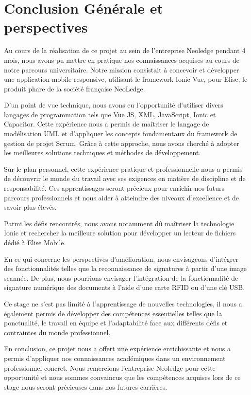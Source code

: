 \chapter*{Conclusion Générale et perspectives}
\label{sec:conclusion}
\setlength{\parindent}{1em}
  

Au cours de la réalisation de ce projet au sein de l'entreprise Neoledge pendant 4 mois, nous avons pu mettre en pratique nos connaissances acquises au cours de notre parcours universitaire. Notre mission consistait à concevoir et développer une application mobile responsive, utilisant le framework Ionic Vue, pour Elise, le produit phare de la société française NeoLedge. 

\medskip

D'un point de vue technique, nous avons eu l'opportunité d'utiliser divers langages de programmation tels que Vue JS, XML, JavaScript, Ionic et Capacitor. Cette expérience nous a permis de maîtriser le langage de modélisation UML et d'appliquer les concepts fondamentaux du framework de gestion de projet Scrum. Grâce à cette approche, nous avons cherché à adopter les meilleures solutions techniques et méthodes de développement. 

\medskip

Sur le plan personnel, cette expérience pratique et professionnelle nous a permis de découvrir le monde du travail avec ses exigences en matière de discipline et de responsabilité. Ces apprentissages seront précieux pour enrichir nos futurs parcours professionnels et nous aider à atteindre des niveaux d'excellence et de savoir plus élevés. 

\medskip

Parmi les défis rencontrés, nous avons notamment dû maîtriser la technologie Ionic et rechercher la meilleure solution pour développer un lecteur de fichiers dédié à Elise Mobile. 

\medskip

En ce qui concerne les perspectives d'amélioration, nous envisageons d'intégrer des fonctionnalités telles que la reconnaissance de signatures à partir d'une image scannée. De plus, nous pourrions envisager l'intégration de la fonctionnalité de signature numérique des documents à l'aide d'une carte RFID ou d'une clé USB. 

\medskip

Ce stage ne s'est pas limité à l'apprentissage de nouvelles technologies, il nous a également permis de développer des compétences essentielles telles que la ponctualité, le travail en équipe et l'adaptabilité face aux différents défis et contraintes du monde professionnel. 

\medskip

En conclusion, ce projet nous a offert une expérience enrichissante et nous a permis d'appliquer nos connaissances académiques dans un environnement professionnel concret. Nous remercions l'entreprise Neoledge pour cette opportunité et nous sommes convaincus que les compétences acquises lors de ce stage nous seront précieuses dans nos futures carrières. 